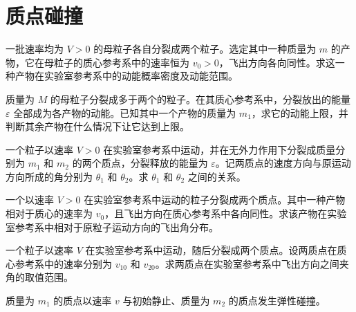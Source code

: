\renewcommand{\thesection}{\arabic{section}}\renewcommand{\theHsection}{chapter.\arabic{section}}\setcounter{section}{3}\section{质点碰撞}
\noindent\begin{minipage}{\textwidth}
一批速率均为 $V>0$ 的母粒子各自分裂成两个粒子。选定其中一种质量为 $m$ 的产物，它在母粒子的质心参考系中的速率恒为 $v_0>0$，飞出方向各向同性。求这一种产物在实验室参考系中的动能概率密度及动能范围。
\end{minipage}\par\vfill
\noindent\begin{minipage}{\textwidth}
质量为 $M$ 的母粒子分裂成多于两个的粒子。在其质心参考系中，分裂放出的能量 $\varepsilon$ 全部成为各产物的动能。已知其中一个产物的质量为 $m_1$，求它的动能上限，并判断其余产物在什么情况下让它达到上限。
\end{minipage}\par\vfill
\newpage
\noindent\begin{minipage}{\textwidth}
一个粒子以速率 $V>0$ 在实验室参考系中运动，并在无外力作用下分裂成质量分别为 $m_1$ 和 $m_2$ 的两个质点，分裂释放的能量为 $\varepsilon$。记两质点的速度方向与原运动方向所成的角分别为 $\theta_1$ 和 $\theta_2$。求 $\theta_1$ 和 $\theta_2$ 之间的关系。
\end{minipage}\par\vfill
\noindent\begin{minipage}{\textwidth}
一个以速率 $V>0$ 在实验室参考系中运动的粒子分裂成两个质点。其中一种产物相对于质心的速率为 $v_0$，且飞出方向在质心参考系中各向同性。求该产物在实验室参考系中相对于原粒子运动方向的飞出角分布。
\end{minipage}\par\vfill
\newpage
\noindent\begin{minipage}{\textwidth}
一个粒子以速率 $V$ 在实验室参考系中运动，随后分裂成两个质点。设两质点在质心参考系中的速率分别为 $v_{10}$ 和 $v_{20}$。求两质点在实验室参考系中飞出方向之间夹角的取值范围。
\end{minipage}\par\vfill
\noindent\begin{minipage}{\textwidth}
质量为 $m_1$ 的质点以速率 $v$ 与初始静止、质量为 $m_2$ 的质点发生弹性碰撞。
\end{minipage}\par\vfill
